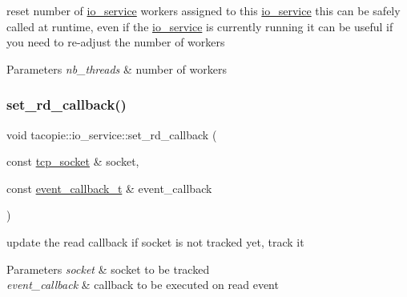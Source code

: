 reset number of \hyperlink{classtacopie_1_1io__service}{io\+\_\+service} workers assigned to this \hyperlink{classtacopie_1_1io__service}{io\+\_\+service} this can be safely called at runtime, even if the \hyperlink{classtacopie_1_1io__service}{io\+\_\+service} is currently running it can be useful if you need to re-\/adjust the number of workers


\begin{DoxyParams}{Parameters}
{\em nb\+\_\+threads} & number of workers \\
\hline
\end{DoxyParams}
\mbox{\label{classtacopie_1_1io__service_a8094c1fec76c6821cc0c008fe524c89a}} 
\subsubsection{\texorpdfstring{set\+\_\+rd\+\_\+callback()}{set\_rd\_callback()}}
{\footnotesize\ttfamily void tacopie\+::io\+\_\+service\+::set\+\_\+rd\+\_\+callback (\begin{DoxyParamCaption}\item[{const \hyperlink{classtacopie_1_1tcp__socket}{tcp\+\_\+socket} \&}]{socket,  }\item[{const \hyperlink{classtacopie_1_1io__service_abb66850c32d9c724f4418d77bd04bcfd}{event\+\_\+callback\+\_\+t} \&}]{event\+\_\+callback }\end{DoxyParamCaption})}

update the read callback if socket is not tracked yet, track it


\begin{DoxyParams}{Parameters}
{\em socket} & socket to be tracked \\
\hline
{\em event\+\_\+callback} & callback to be executed on read event \\
\hline
\end{DoxyParams}
\mbox{\label{classtacopie_1_1io__service_a7c4f56c7790c7ba52b09837a42aaffb1}} 
